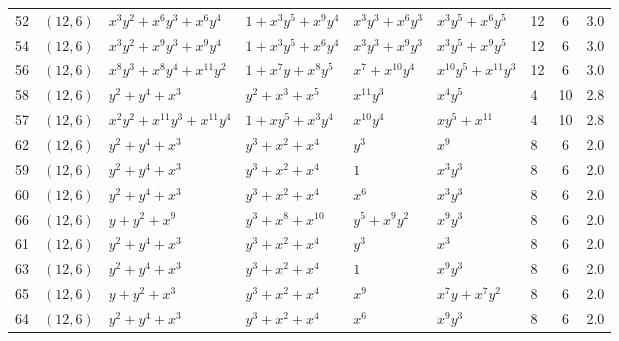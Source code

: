 \begin{table}[t]
\begin{tabular*}{\textwidth}{@{\extracolsep{\fill}}cllllllcc}
52 & $(12,6)$ & $x^{3}y^{2}{+}x^{6}y^{3}{+}x^{6}y^{4}$ & $1{+}x^{3}y^{5}{+}x^{9}y^{4}$ & $x^{3}y^{3}{+}x^{6}y^{3}$ & $x^{3}y^{5}{+}x^{6}y^{5}$ & 12 & 6 & 3.0 \\
54 & $(12,6)$ & $x^{3}y^{2}{+}x^{9}y^{3}{+}x^{9}y^{4}$ & $1{+}x^{3}y^{5}{+}x^{6}y^{4}$ & $x^{3}y^{3}{+}x^{9}y^{3}$ & $x^{3}y^{5}{+}x^{9}y^{5}$ & 12 & 6 & 3.0 \\
56 & $(12,6)$ & $x^{8}y^{3}{+}x^{8}y^{4}{+}x^{11}y^{2}$ & $1{+}x^{7}y{+}x^{8}y^{5}$ & $x^{7}{+}x^{10}y^{4}$ & $x^{10}y^{5}{+}x^{11}y^{3}$ & 12 & 6 & 3.0 \\
58 & $(12,6)$ & $y^{2}{+}y^{4}{+}x^{3}$ & $y^{2}{+}x^{3}{+}x^{5}$ & $x^{11}y^{3}$ & $x^{4}y^{5}$ & 4 & 10 & 2.8 \\
57 & $(12,6)$ & $x^{2}y^{2}{+}x^{11}y^{3}{+}x^{11}y^{4}$ & $1{+}xy^{5}{+}x^{3}y^{4}$ & $x^{10}y^{4}$ & $xy^{5}{+}x^{11}$ & 4 & 10 & 2.8 \\
62 & $(12,6)$ & $y^{2}{+}y^{4}{+}x^{3}$ & $y^{3}{+}x^{2}{+}x^{4}$ & $y^{3}$ & $x^{9}$ & 8 & 6 & 2.0 \\
59 & $(12,6)$ & $y^{2}{+}y^{4}{+}x^{3}$ & $y^{3}{+}x^{2}{+}x^{4}$ & $1$ & $x^{3}y^{3}$ & 8 & 6 & 2.0 \\
60 & $(12,6)$ & $y^{2}{+}y^{4}{+}x^{3}$ & $y^{3}{+}x^{2}{+}x^{4}$ & $x^{6}$ & $x^{3}y^{3}$ & 8 & 6 & 2.0 \\
66 & $(12,6)$ & $y{+}y^{2}{+}x^{9}$ & $y^{3}{+}x^{8}{+}x^{10}$ & $y^{5}{+}x^{9}y^{2}$ & $x^{9}y^{3}$ & 8 & 6 & 2.0 \\
61 & $(12,6)$ & $y^{2}{+}y^{4}{+}x^{3}$ & $y^{3}{+}x^{2}{+}x^{4}$ & $y^{3}$ & $x^{3}$ & 8 & 6 & 2.0 \\
63 & $(12,6)$ & $y^{2}{+}y^{4}{+}x^{3}$ & $y^{3}{+}x^{2}{+}x^{4}$ & $1$ & $x^{9}y^{3}$ & 8 & 6 & 2.0 \\
65 & $(12,6)$ & $y{+}y^{2}{+}x^{3}$ & $y^{3}{+}x^{2}{+}x^{4}$ & $x^{9}$ & $x^{7}y{+}x^{7}y^{2}$ & 8 & 6 & 2.0 \\
64 & $(12,6)$ & $y^{2}{+}y^{4}{+}x^{3}$ & $y^{3}{+}x^{2}{+}x^{4}$ & $x^{6}$ & $x^{9}y^{3}$ & 8 & 6 & 2.0 \\
\bottomrule
\end{tabular*}
\end{table}

